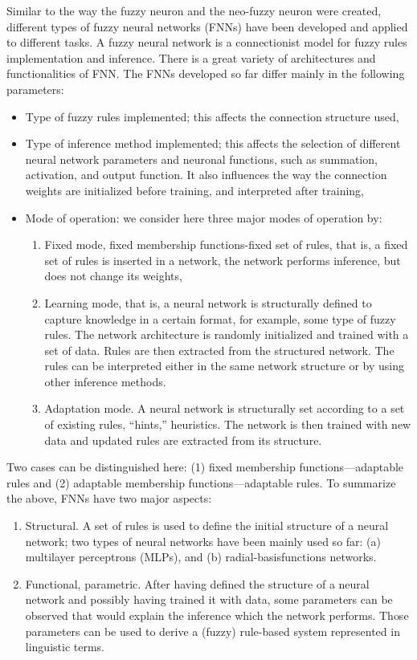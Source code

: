 Similar to the way the fuzzy neuron and the neo-fuzzy neuron were created, different types of fuzzy neural networks (FNNs) have been developed and applied to different tasks.
A fuzzy neural network is a connectionist model for fuzzy rules implementation and inference. There is a great variety of architectures and functionalities of FNN.
The FNNs developed so far differ mainly in the following parameters:
\begin{itemize}
\item Type of fuzzy rules implemented; this affects the connection structure used,
\item Type of inference method implemented; this affects the selection of different neural network parameters and neuronal functions, such as summation, activation, and output function. It also influences the way the connection weights are initialized before training, and interpreted after training,
\item Mode of operation: we consider here three major modes of operation by:
	\begin{enumerate}
	\item Fixed mode, fixed membership functions-fixed set of rules, that is, a fixed set of rules is inserted in a network, the network performs inference, but does not change its weights,
	\item Learning mode, that is, a neural network is structurally defined to capture knowledge in a certain format, for example, some type of fuzzy rules. The network architecture is randomly initialized and trained with a set of data. Rules are then extracted from the structured network. The rules can be interpreted either in the same network structure or by using other inference methods.
	\item Adaptation mode. A neural network is structurally set according to a set of existing rules, ``hints,'' heuristics. The network is then trained with new data and updated rules are extracted from its structure.
	\end{enumerate}
\end{itemize}

Two cases can be distinguished here: (1) fixed membership functions—adaptable rules and (2)
adaptable membership functions—adaptable rules.
To summarize the above, FNNs have two major aspects:
\begin{enumerate}
\item Structural. A set of rules is used to define the initial structure of a neural network; two types of neural networks have been mainly used so far: (a) multilayer perceptrons (MLPs), and (b) radial-basisfunctions networks.
\item Functional, parametric. After having defined the structure of a neural network and possibly having trained it with data, some parameters can be observed that would explain the inference which the network performs. Those parameters can be used to derive a (fuzzy) rule-based system represented in linguistic terms.
\end{enumerate}
